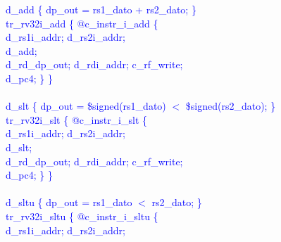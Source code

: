 \textcolor{blue}{
\indent d\_add \{ dp\_out = rs1\_dato + rs2\_dato; \}\\%
\indent tr\_rv32i\_add \{ @c\_instr\_i\_add \{ \\%
\indent \hspace{\parindent} d\_rs1i\_addr; d\_rs2i\_addr; \\%
\indent \hspace{\parindent} d\_add; \\%
\indent \hspace{\parindent} d\_rd\_dp\_out; d\_rdi\_addr; c\_rf\_write;  \\%
\indent \hspace{\parindent} d\_pc4; \} \} \\%
\\
\indent d\_slt \{ dp\_out = \$signed(rs1\_dato) $<$ \$signed(rs2\_dato); \}\\%
\indent tr\_rv32i\_slt \{ @c\_instr\_i\_slt \{ \\%
\indent \hspace{\parindent} d\_rs1i\_addr; d\_rs2i\_addr; \\%
\indent \hspace{\parindent} d\_slt; \\%
\indent \hspace{\parindent} d\_rd\_dp\_out; d\_rdi\_addr; c\_rf\_write;  \\%
\indent \hspace{\parindent} d\_pc4; \} \} \\%
\\
\indent d\_sltu \{ dp\_out = rs1\_dato $<$ rs2\_dato; \}\\%
\indent tr\_rv32i\_sltu \{ @c\_instr\_i\_sltu \{ \\%
\indent \hspace{\parindent} d\_rs1i\_addr; d\_rs2i\_addr; \\%
}
